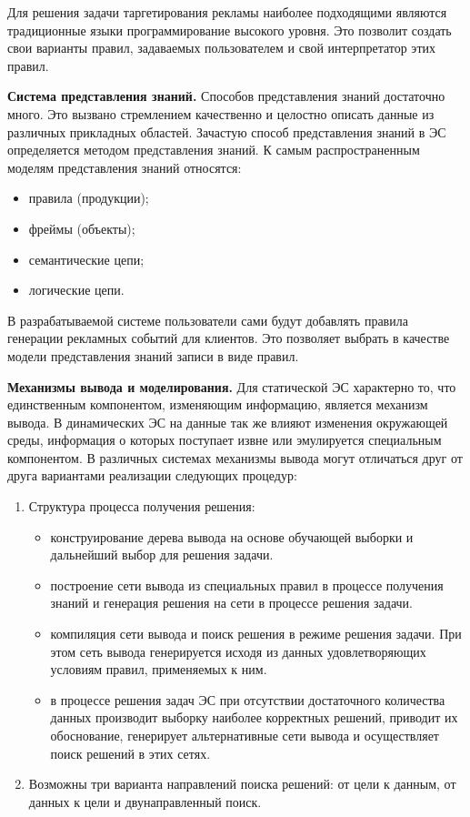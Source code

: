 Для решения задачи таргетирования рекламы наиболее подходящими являются традиционные языки программирование высокого уровня. Это позволит создать свои варианты правил, задаваемых пользователем и свой интерпретатор этих правил.

\textbf{Система представления знаний.} Способов представления знаний достаточно много. Это вызвано стремлением качественно и целостно описать данные из различных прикладных областей. Зачастую способ представления знаний в ЭС определяется методом представления знаний. К самым распространенным моделям представления знаний относятся:

\begin{itemize}
\item правила (продукции);
\item фреймы (объекты);
\item семантические цепи;
\item логические цепи.
\end{itemize}

В разрабатываемой системе пользователи сами будут добавлять правила генерации рекламных событий для клиентов. Это позволяет выбрать в качестве модели представления знаний записи в виде правил.

\textbf{Механизмы вывода и моделирования.} Для статической ЭС характерно то, что единственным компонентом, изменяющим информацию, является механизм вывода. В динамических ЭС на данные так же влияют изменения окружающей среды, информация о которых поступает извне или эмулируется специальным компонентом. В различных системах механизмы вывода могут отличаться друг от друга вариантами реализации следующих процедур:

\begin{enumerate}
	\item Структура процесса получения решения:
	\begin{itemize}
		\item конструирование дерева вывода на основе обучающей выборки и дальнейший выбор для решения задачи.
		\item построение сети вывода из специальных правил в процессе получения знаний и генерация решения на сети в процессе решения задачи.
		\item компиляция сети вывода и поиск решения в режиме решения задачи. При этом сеть вывода генерируется исходя из данных удовлетворяющих условиям правил, применяемых к ним.
		\item в процессе решения задач ЭС при отсутствии достаточного количества данных производит выборку наиболее корректных решений, приводит их обоснование, генерирует альтернативные сети вывода и осуществляет поиск решений в этих сетях.
	\end{itemize}

	\item Возможны три варианта направлений поиска решений: от цели к данным, от данных к цели и двунаправленный поиск.
\end{enumerate}

